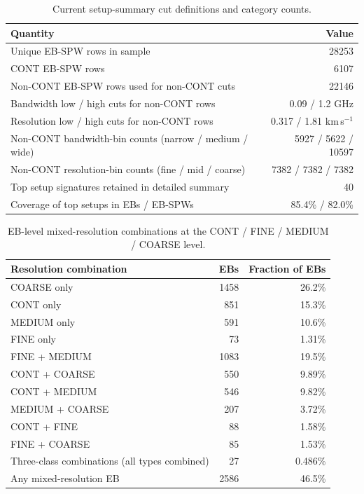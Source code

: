 \documentclass[11pt]{article}
\begin{document}
\begin{table}[h]
\centering
\caption{Current setup-summary cut definitions and category counts.}
\label{tab:setupcuts}
\small
\begin{tabular}{p{3.6in}r}
\toprule
Quantity & Value \\
\midrule
Unique EB-SPW rows in sample & 28253 \\
CONT EB-SPW rows & 6107 \\
Non-CONT EB-SPW rows used for non-CONT cuts & 22146 \\
Bandwidth low / high cuts for non-CONT rows & 0.09 / 1.2 GHz \\
Resolution low / high cuts for non-CONT rows & 0.317 / 1.81 km\,s$^{-1}$ \\
Non-CONT bandwidth-bin counts (narrow / medium / wide) & 5927 / 5622 / 10597 \\
Non-CONT resolution-bin counts (fine / mid / coarse) & 7382 / 7382 / 7382 \\
Top setup signatures retained in detailed summary & 40 \\
Coverage of top setups in EBs / EB-SPWs & 85.4\% / 82.0\% \\
\bottomrule
\end{tabular}
\end{table}

\begin{table}[h]
\centering
\caption{EB-level mixed-resolution combinations at the CONT / FINE / MEDIUM / COARSE level.}
\label{tab:mixedres}
\small
\begin{tabular}{lrr}
\toprule
Resolution combination & EBs & Fraction of EBs \\
\midrule
COARSE only & 1458 & 26.2\% \\
CONT only & 851 & 15.3\% \\
MEDIUM only & 591 & 10.6\% \\
FINE only & 73 & 1.31\% \\
FINE + MEDIUM & 1083 & 19.5\% \\
CONT + COARSE & 550 & 9.89\% \\
CONT + MEDIUM & 546 & 9.82\% \\
MEDIUM + COARSE & 207 & 3.72\% \\
CONT + FINE & 88 & 1.58\% \\
FINE + COARSE & 85 & 1.53\% \\
Three-class combinations (all types combined) & 27 & 0.486\% \\
\midrule
Any mixed-resolution EB & 2586 & 46.5\% \\
\bottomrule
\end{tabular}
\end{table}
\end{document}
